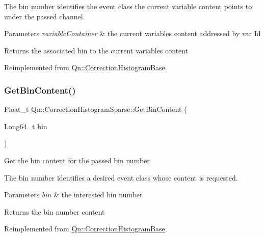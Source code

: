 The bin number identifies the event class the current variable content points to under the passed channel.


\begin{DoxyParams}{Parameters}
{\em variable\+Container} & the current variables content addressed by var Id \\
\hline
\end{DoxyParams}
\begin{DoxyReturn}{Returns}
the associated bin to the current variables content 
\end{DoxyReturn}


Reimplemented from \mbox{\hyperlink{classQn_1_1CorrectionHistogramBase_ab1f64550f4e1812864da6f9f6ea565e6}{Qn\+::\+Correction\+Histogram\+Base}}.

\mbox{\label{classQn_1_1CorrectionHistogramSparse_a43954a12a3f97e20a1934f18ec4edecd}} 
\subsubsection{\texorpdfstring{Get\+Bin\+Content()}{GetBinContent()}}
{\footnotesize\ttfamily Float\+\_\+t Qn\+::\+Correction\+Histogram\+Sparse\+::\+Get\+Bin\+Content (\begin{DoxyParamCaption}\item[{Long64\+\_\+t}]{bin }\end{DoxyParamCaption})\hspace{0.3cm}{\ttfamily [virtual]}}

Get the bin content for the passed bin number

The bin number identifies a desired event class whose content is requested.


\begin{DoxyParams}{Parameters}
{\em bin} & the interested bin number \\
\hline
\end{DoxyParams}
\begin{DoxyReturn}{Returns}
the bin number content 
\end{DoxyReturn}


Reimplemented from \mbox{\hyperlink{classQn_1_1CorrectionHistogramBase_a9e4e745a6f4cbebf5b9277d6d63bc9c7}{Qn\+::\+Correction\+Histogram\+Base}}.

